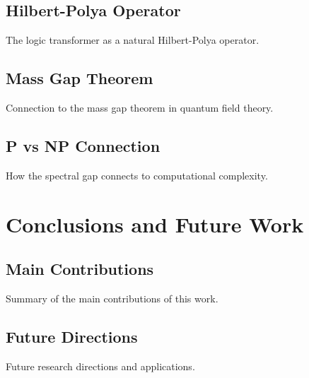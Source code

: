 \documentclass[11pt,a4paper]{article}
\theoremstyle{definition}
\begin{document}
\subsection{Hilbert-Polya Operator}
The logic transformer as a natural Hilbert-Polya operator.

\subsection{Mass Gap Theorem}
Connection to the mass gap theorem in quantum field theory.

\subsection{P vs NP Connection}
How the spectral gap connects to computational complexity.

\section{Conclusions and Future Work}
\label{sec:conclusions}

\subsection{Main Contributions}
Summary of the main contributions of this work.

\subsection{Future Directions}
Future research directions and applications.



\end{document}
